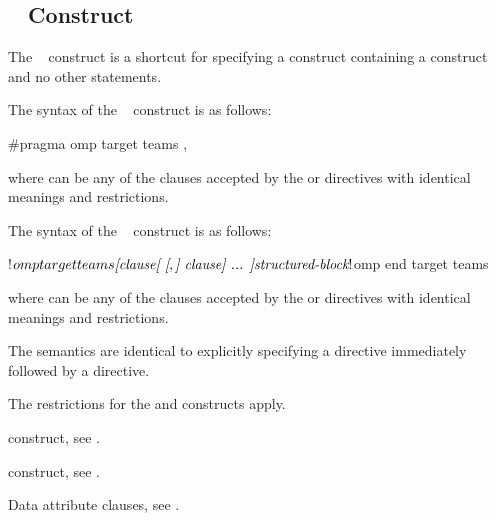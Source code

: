 \subsection{~ Construct}
\label{subsec:target teams Construct}
\summary
The ~ construct is a shortcut for specifying 
a  construct containing a  construct and no other statements.

\syntax
\begin{ccppspecific}
The syntax of the ~ construct is as follows:

\begin{ompcPragma}
#pragma omp target teams \plc{[clause[ [},\plc{] clause] ... ] new-line}
\end{ompcPragma}

where  can be any of the clauses accepted by the  
or  directives with identical meanings and restrictions.
\end{ccppspecific}

\begin{fortranspecific}
The syntax of the ~ construct is as follows:

\begin{ompfPragma}
!$omp target teams \plc{[clause[ [},\plc{] clause] ... ]}
    \plc{structured-block}
!$omp end target teams
\end{ompfPragma}

where  can be any of the clauses accepted by the  
or  directives with identical meanings and restrictions.
\end{fortranspecific}

\descr

The semantics are identical to explicitly specifying a  directive
immediately followed by a  directive.

\restrictions
The restrictions for the  and  constructs apply.

\begin{crossrefs}
\item {} construct, see .

\item {} construct, see .

\item Data attribute clauses, see
.
\end{crossrefs}



